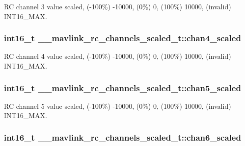 R\+C channel 3 value scaled, (-\/100\%) -\/10000, (0\%) 0, (100\%) 10000, (invalid) I\+N\+T16\+\_\+\+M\+A\+X. 

\hypertarget{struct____mavlink__rc__channels__scaled__t_a707b8ff01d82e1ddb4aa440c60265315}{
\subsubsection[{chan4\+\_\+scaled}]{\setlength{\rightskip}{0pt plus 5cm}int16\+\_\+t \+\_\+\+\_\+mavlink\+\_\+rc\+\_\+channels\+\_\+scaled\+\_\+t\+::chan4\+\_\+scaled}}\label{struct____mavlink__rc__channels__scaled__t_a707b8ff01d82e1ddb4aa440c60265315}


R\+C channel 4 value scaled, (-\/100\%) -\/10000, (0\%) 0, (100\%) 10000, (invalid) I\+N\+T16\+\_\+\+M\+A\+X. 

\hypertarget{struct____mavlink__rc__channels__scaled__t_a746191bf8db147d0271f755814e62c5d}{
\subsubsection[{chan5\+\_\+scaled}]{\setlength{\rightskip}{0pt plus 5cm}int16\+\_\+t \+\_\+\+\_\+mavlink\+\_\+rc\+\_\+channels\+\_\+scaled\+\_\+t\+::chan5\+\_\+scaled}}\label{struct____mavlink__rc__channels__scaled__t_a746191bf8db147d0271f755814e62c5d}


R\+C channel 5 value scaled, (-\/100\%) -\/10000, (0\%) 0, (100\%) 10000, (invalid) I\+N\+T16\+\_\+\+M\+A\+X. 

\hypertarget{struct____mavlink__rc__channels__scaled__t_a0554cbaeb193f0243986c02c6396b159}{
\subsubsection[{chan6\+\_\+scaled}]{\setlength{\rightskip}{0pt plus 5cm}int16\+\_\+t \+\_\+\+\_\+mavlink\+\_\+rc\+\_\+channels\+\_\+scaled\+\_\+t\+::chan6\+\_\+scaled}}\label{struct____mavlink__rc__channels__scaled__t_a0554cbaeb193f0243986c02c6396b159}


